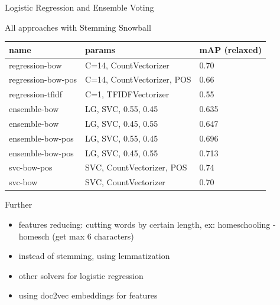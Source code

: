 \documentclass[english,handout]{mlutalk}
\begin{document}
\begin{frame}[allowframebreaks]{Logistic Regression and Ensemble Voting}

\begin{block}{All approaches with Stemming Snowball}
  \begin{tabular}{lll}
    \toprule
      name & params & mAP (relaxed) \\
    \midrule
      regression-bow & C=14, CountVectorizer & 0.70 \\
      regression-bow-pos & C=14, CountVectorizer, POS & 0.66\\
      regression-tfidf & C=1, TFIDFVectorizer & 0.55 \\
      ensemble-bow & LG, SVC, 0.55, 0.45 & 0.635 \\
      ensemble-bow & LG, SVC, 0.45, 0.55 & 0.647 \\
      ensemble-bow-pos & LG, SVC, 0.55, 0.45 & 0.696 \\
      ensemble-bow-pos & LG, SVC, 0.45, 0.55 & 0.713 \\
      svc-bow-pos & SVC, CountVectorizer, POS &   0.74 \\
      svc-bow & SVC, CountVectorizer & 0.70\\
    \bottomrule
  \end{tabular}
\end{block}
\framebreak
\begin{block}{Further}
\begin{itemize}
    \item features reducing: cutting words by certain length, ex: homeschooling - homesch (get max 6 characters)
    \item instead of stemming, using lemmatization
    \item other solvers for logistic regression
    \item using doc2vec embeddings for features
\end{itemize}
\end{block}
\end{frame}



\appendix
\section{\appendixname}

\bibliographyframe
\end{document}
